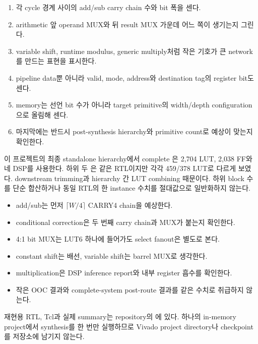 \begin{enumerate}
  \item 각 cycle 경계 사이의 add/sub carry chain 수와 bit 폭을 센다.
  \item arithmetic 앞 operand MUX와 뒤 result MUX 가운데 어느 쪽이 생기는지
        그린다.
  \item variable shift, runtime modulus, generic multiply처럼 작은 기호가
        큰 network를 만드는 표현을 표시한다.
  \item pipeline data뿐 아니라 valid, mode, address와 destination tag의
        register bit도 센다.
  \item memory는 선언 bit 수가 아니라 target primitive의 width/depth
        configuration으로 올림해 센다.
  \item 마지막에는 반드시 post-synthesis hierarchy와 primitive count로
        예상이 맞는지 확인한다.
\end{enumerate}

이 프로젝트의 최종 standalone hierarchy에서 complete
은 2,704 LUT, 2,038 FF와 네 DSP를 사용한다.
하위 두 은 같은 RTL이지만 각각 459/378 LUT로 다르게
보였다. downstream trimming과 hierarchy 간 LUT combining 때문이다.
하위 block 수를 단순 합산하거나 동일 RTL의 한 instance 수치를 절대값으로
일반화하지 않는다.

\begin{checklistbox}
\begin{itemize}
  \item add/sub는 먼저 $\lceil W/4\rceil$ CARRY4 chain을 예상한다.
  \item conditional correction은 두 번째 carry chain과 MUX가 붙는지 확인한다.
  \item 4:1 bit MUX는 LUT6 하나에 들어가도 select fanout은 별도로 본다.
  \item constant shift는 배선, variable shift는 barrel MUX로 생각한다.
  \item multiplication은 DSP inference report와 내부 register 흡수를 확인한다.
  \item 작은 OOC 결과와 complete-system post-route 결과를 같은 수치로 취급하지 않는다.
\end{itemize}
\end{checklistbox}

재현용 RTL, Tcl과 실제 summary는 repository의
에 있다. 하나의 in-memory project에서
synthesis를 한 번만 실행하므로 Vivado project directory나 checkpoint를
저장소에 남기지 않는다.

